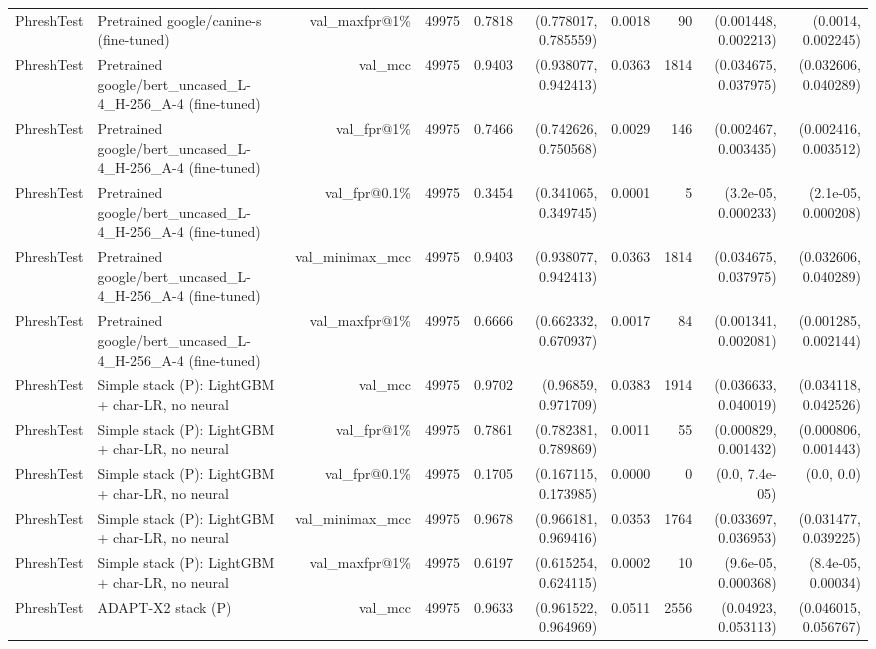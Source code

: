 \begin{table}[t]
\begin{tabular}{llrrrrrrrr}
PhreshTest & Pretrained google/canine-s (fine-tuned) & val\_maxfpr@1\% & 49975 & 0.7818 & (0.778017, 0.785559) & 0.0018 & 90 & (0.001448, 0.002213) & (0.0014, 0.002245) \\
PhreshTest & Pretrained google/bert\_uncased\_L-4\_H-256\_A-4 (fine-tuned) & val\_mcc & 49975 & 0.9403 & (0.938077, 0.942413) & 0.0363 & 1814 & (0.034675, 0.037975) & (0.032606, 0.040289) \\
PhreshTest & Pretrained google/bert\_uncased\_L-4\_H-256\_A-4 (fine-tuned) & val\_fpr@1\% & 49975 & 0.7466 & (0.742626, 0.750568) & 0.0029 & 146 & (0.002467, 0.003435) & (0.002416, 0.003512) \\
PhreshTest & Pretrained google/bert\_uncased\_L-4\_H-256\_A-4 (fine-tuned) & val\_fpr@0.1\% & 49975 & 0.3454 & (0.341065, 0.349745) & 0.0001 & 5 & (3.2e-05, 0.000233) & (2.1e-05, 0.000208) \\
PhreshTest & Pretrained google/bert\_uncased\_L-4\_H-256\_A-4 (fine-tuned) & val\_minimax\_mcc & 49975 & 0.9403 & (0.938077, 0.942413) & 0.0363 & 1814 & (0.034675, 0.037975) & (0.032606, 0.040289) \\
PhreshTest & Pretrained google/bert\_uncased\_L-4\_H-256\_A-4 (fine-tuned) & val\_maxfpr@1\% & 49975 & 0.6666 & (0.662332, 0.670937) & 0.0017 & 84 & (0.001341, 0.002081) & (0.001285, 0.002144) \\
PhreshTest & Simple stack (P): LightGBM + char-LR, no neural & val\_mcc & 49975 & 0.9702 & (0.96859, 0.971709) & 0.0383 & 1914 & (0.036633, 0.040019) & (0.034118, 0.042526) \\
PhreshTest & Simple stack (P): LightGBM + char-LR, no neural & val\_fpr@1\% & 49975 & 0.7861 & (0.782381, 0.789869) & 0.0011 & 55 & (0.000829, 0.001432) & (0.000806, 0.001443) \\
PhreshTest & Simple stack (P): LightGBM + char-LR, no neural & val\_fpr@0.1\% & 49975 & 0.1705 & (0.167115, 0.173985) & 0.0000 & 0 & (0.0, 7.4e-05) & (0.0, 0.0) \\
PhreshTest & Simple stack (P): LightGBM + char-LR, no neural & val\_minimax\_mcc & 49975 & 0.9678 & (0.966181, 0.969416) & 0.0353 & 1764 & (0.033697, 0.036953) & (0.031477, 0.039225) \\
PhreshTest & Simple stack (P): LightGBM + char-LR, no neural & val\_maxfpr@1\% & 49975 & 0.6197 & (0.615254, 0.624115) & 0.0002 & 10 & (9.6e-05, 0.000368) & (8.4e-05, 0.00034) \\
PhreshTest & ADAPT-X2 stack (P) & val\_mcc & 49975 & 0.9633 & (0.961522, 0.964969) & 0.0511 & 2556 & (0.04923, 0.053113) & (0.046015, 0.056767) \\

\end{tabular}
\end{table}
